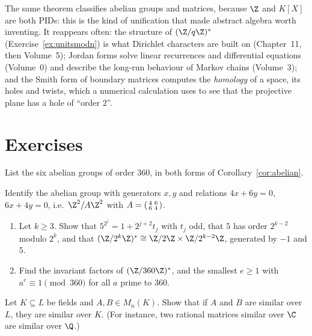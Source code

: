 \begin{beauty}
The same theorem classifies abelian groups and matrices, because $\Z$ and $K[X]$ are both PIDs: this is the kind of unification that made abstract algebra worth inventing. It reappears often: the structure of $(\Z/q\Z)^*$ (Exercise~\ref{ex:unitsmodn}) is what Dirichlet characters are built on (Chapter~11, then Volume~5); Jordan forms solve linear recurrences and differential equations (Volume~0) and describe the long-run behaviour of Markov chains (Volume~3); and the Smith form of boundary matrices computes the \emph{homology} of a space, its holes and twists, which a numerical calculation uses to see that the projective plane has a hole of ``order $2$''.
\end{beauty}

\section{Exercises}

\begin{exercise}[$\star$]\label{ex:ab360}
List the six abelian groups of order $360$, in both forms of Corollary~\ref{cor:abelian}.
\end{exercise}

\begin{exercise}[$\star$]\label{ex:smithcalc}
Identify the abelian group with generators $x,y$ and relations $4x+6y=0$, $6x+4y=0$, i.e.\ $\Z^2/A\Z^2$ with $A=\begin{psmallmatrix}4&6\\6&4\end{psmallmatrix}$.
\end{exercise}

\begin{exercise}[$\star\star$]\label{ex:unitsmodn}
\begin{enumerate}[label=(\alph*)]
\item Let $k\ge3$. Show that $5^{2^j}=1+2^{j+2}t_j$ with $t_j$ odd, that $5$ has order $2^{k-2}$ modulo $2^k$, and that $(\Z/2^k\Z)^*\cong\Z/2\Z\times\Z/2^{k-2}\Z$, generated by $-1$ and $5$.
\item Find the invariant factors of $(\Z/360\Z)^*$, and the smallest $e\ge1$ with $a^e\equiv1\pmod{360}$ for all $a$ prime to $360$.
\end{enumerate}
\end{exercise}

\begin{exercise}[$\star\star$]\label{ex:similarQ}
Let $K\subseteq L$ be fields and $A,B\in M_n(K)$. Show that if $A$ and $B$ are similar over $L$, they are similar over $K$. (For instance, two rational matrices similar over $\C$ are similar over $\Q$.)
\end{exercise}

